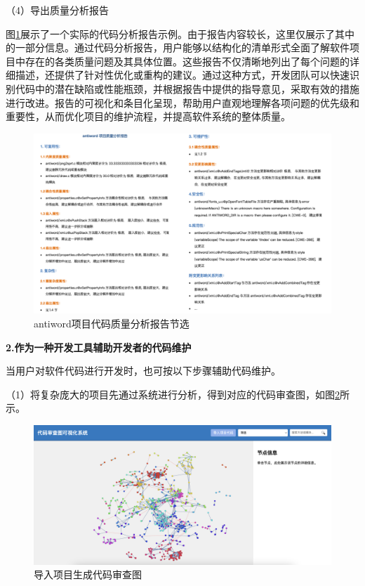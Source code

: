 \noindent（4）导出质量分析报告

图\ref{4_报告节选}展示了一个实际的代码分析报告示例。由于报告内容较长，这里仅展示了其中的一部分信息。通过代码分析报告，用户能够以结构化的清单形式全面了解软件项目中存在的各类质量问题及其具体位置。这些报告不仅清晰地列出了每个问题的详细描述，还提供了针对性优化或重构的建议。通过这种方式，开发团队可以快速识别代码中的潜在缺陷或性能瓶颈，并根据报告中提供的指导意见，采取有效的措施进行改进。报告的可视化和条目化呈现，帮助用户直观地理解各项问题的优先级和重要性，从而优化项目的维护流程，并提高软件系统的整体质量。

\begin{figure}[h]
\centering
\includegraphics[width = 1.0\textwidth]{figures/报告.png}
\caption{antiword项目代码质量分析报告节选}
\label{4_报告节选}
\end{figure}


\noindent \textbf{2.作为一种开发工具辅助开发者的代码维护} 

当用户对软件代码进行开发时，也可按以下步骤辅助代码维护。

\noindent（1）将复杂庞大的项目先通过系统进行分析，得到对应的代码审查图，如图\ref{1_导入项目生成代码审查图}所示。

\begin{figure}[h]
\centering
\includegraphics[width = 1.0\textwidth]{figures/开发1.jpg}
\caption{导入项目生成代码审查图}
\label{1_导入项目生成代码审查图}
\end{figure}

